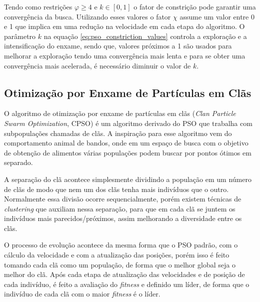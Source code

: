 Tendo como restrições $\varphi \geq 4$ e $k \in [0,1]$ o fator de constrição pode garantir uma convergência da busca. Utilizando esses valores o fator $\chi$ assume um valor entre 0 e 1 que implica em uma redução na velocidade em cada etapa do algoritmo. O parâmetro $k$ na equação \ref{eq:pso_constriction_values} controla a exploração e a intensificação do enxame, sendo que, valores próximos a 1 são usados para melhorar a exploração tendo uma convergência mais lenta e para se obter uma convergência mais acelerada, é necessário diminuir o valor de $k$.

\subsection{Otimização por Enxame de Partículas em Clãs}

O algoritmo de otimização por enxame de partículas em clãs (\textit{Clan Particle Swarm Optimization}, CPSO) \cite{ferreira2009clan} é um algoritmo derivado do PSO que trabalha com subpopulações chamadas de clãs. A inspiração para esse algoritmo vem do comportamento animal de bandos, onde em um espaço de busca com o objetivo de obtenção de alimentos várias populações podem buscar por pontos ótimos em separado.

A separação do clã acontece simplesmente dividindo a população em um número de clãs de modo que nem um dos clãs tenha mais indivíduos que o outro. Normalmente essa divisão ocorre sequencialmente, porém existem técnicas de \textit{clustering} que auxiliam nessa separação, para que em cada clã se juntem os indivíduos mais parecidos/próximos, assim melhorando a diversidade entre os clãs.

O processo de evolução acontece da mesma forma que o PSO padrão, com o cálculo da velocidade e com a atualização das posições, porém isso é feito tomando cada clã como um população, de forma que o melhor global seja o melhor do clã. Após cada etapa de atualização das velocidades e de posição de cada indivíduo, é feito a avaliação do \textit{fitness} e definido um líder, de forma que o indivíduo de cada clã com o maior \textit{fitness} é o líder.

